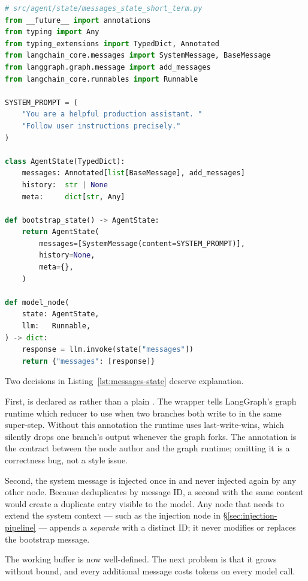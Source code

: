 \begin{lstlisting}[language=Python,
  caption={AgentState TypedDict, SYSTEM\_PROMPT bootstrap, and model\_node using add\_messages},
  label={lst:messages-state}]
# src/agent/state/messages_state_short_term.py
from __future__ import annotations
from typing import Any
from typing_extensions import TypedDict, Annotated
from langchain_core.messages import SystemMessage, BaseMessage
from langgraph.graph.message import add_messages
from langchain_core.runnables import Runnable

SYSTEM_PROMPT = (
    "You are a helpful production assistant. "
    "Follow user instructions precisely."
)

class AgentState(TypedDict):
    messages: Annotated[list[BaseMessage], add_messages]
    history:  str | None
    meta:     dict[str, Any]

def bootstrap_state() -> AgentState:
    return AgentState(
        messages=[SystemMessage(content=SYSTEM_PROMPT)],
        history=None,
        meta={},
    )

def model_node(
    state: AgentState,
    llm:   Runnable,
) -> dict:
    response = llm.invoke(state["messages"])
    return {"messages": [response]}
\end{lstlisting}

Two decisions in Listing~\ref{lst:messages-state} deserve explanation.

First,  is declared as  rather than a plain . The 
wrapper tells LangGraph's graph runtime which reducer to use when two
branches both write to  in the same super-step.
Without this annotation the runtime uses last-write-wins, which silently
drops one branch's output whenever the graph forks. The annotation is
the contract between the node author and the graph runtime; omitting it
is a correctness bug, not a style issue.

Second, the system message is injected once in 
and never injected again by any other node. Because 
deduplicates by message ID, a second  with the same
content would create a duplicate entry visible to the model. Any node
that needs to extend the system context --- such as the injection node
in \S\ref{sec:injection-pipeline} --- appends a \emph{separate}
 with a distinct ID; it never modifies or replaces
the bootstrap message.

The working buffer is now well-defined. The next problem is that it
grows without bound, and every additional message costs tokens on every
model call.

